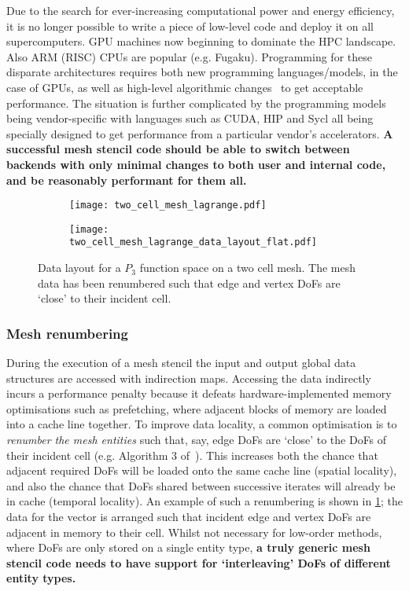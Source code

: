 \documentclass[thesis]{subfiles}
\begin{document}
Due to the search for ever-increasing computational power and energy efficiency, it is no longer possible to write a piece of low-level code and deploy it on all supercomputers.
GPU machines now beginning to dominate the HPC landscape.
Also ARM (RISC) CPUs are popular (e.g. Fugaku).
Programming for these disparate architectures requires both new programming languages/models, in the case of GPUs, as well as high-level algorithmic changes~\cite{betteridgeCodeGenerationProductive2021} to get acceptable performance.
The situation is further complicated by the programming models being vendor-specific with languages such as CUDA, HIP and Sycl all being specially designed to get performance from a particular vendor's accelerators.
\textbf{A successful mesh stencil code should be able to switch between backends with only minimal changes to both user and internal code, and be reasonably performant for them all.}

\begin{figure}
  \centering
  \begin{subfigure}{\textwidth}
    \centering
    \texttt{[image: two\_cell\_mesh\_lagrange.pdf]}
    \vspace{1em}
  \end{subfigure}
  \begin{subfigure}{\textwidth}
    \centering
    \texttt{[image: two\_cell\_mesh\_lagrange\_data\_layout\_flat.pdf]}
  \end{subfigure}
  \caption{
    Data layout for a $P_3$ function space on a two cell mesh.
    The mesh data has been renumbered such that edge and vertex DoFs are `close' to their incident cell.
  }
  \label{fig:mesh_renumbering_demo}
\end{figure}

\subsubsection{Mesh renumbering}

During the execution of a mesh stencil the input and output global data structures are accessed with indirection maps.
Accessing the data indirectly incurs a performance penalty because it defeats hardware-implemented memory optimisations such as prefetching, where adjacent blocks of memory are loaded into a cache line together.
To improve data locality, a common optimisation is to \textit{renumber the mesh entities} such that, say, edge DoFs are `close' to the DoFs of their incident cell (e.g. Algorithm 3 of~\cite{langeEfficientMeshManagement2016}).
This increases both the chance that adjacent required DoFs will be loaded onto the same cache line (spatial locality), and also the chance that DoFs shared between successive iterates will already be in cache (temporal locality).
An example of such a renumbering is shown in \cref{fig:mesh_renumbering_demo}; the data for the vector is arranged such that incident edge and vertex DoFs are adjacent in memory to their cell.
Whilst not necessary for low-order methods, where DoFs are only stored on a single entity type, \textbf{a truly generic mesh stencil code needs to have support for `interleaving' DoFs of different entity types.}
\end{document}
